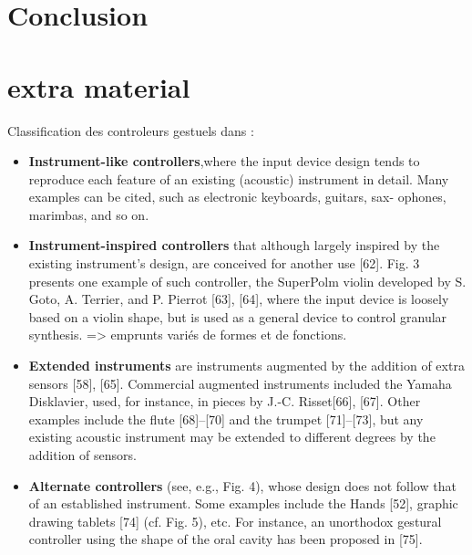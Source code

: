 \section{Conclusion}
\label{sec:interfaces:conclusion}


\section*{extra material}

Classification des controleurs gestuels dans \cite{wanderley_controle_1999}:
\vspace{-1em}
\begin{itemize}[noitemsep]
\item \textbf{Instrument-like controllers},where the input device design tends to reproduce each feature of an existing (acoustic) instrument in detail. Many examples can be cited, such as electronic keyboards, guitars, sax- ophones, marimbas, and so on.
\item \textbf{Instrument-inspired controllers} that although largely inspired by the existing instrument’s design, are conceived for another use [62]. Fig. 3 presents one example of such controller, the SuperPolm violin developed by S. Goto, A. Terrier, and P. Pierrot [63], [64], where the input device is loosely based on a violin shape, but is used as a general device to control granular synthesis. => emprunts variés de formes et de fonctions.
\item \textbf{Extended instruments} are instruments augmented by the addition of extra sensors [58], [65]. Commercial augmented instruments included the Yamaha Disklavier, used, for instance, in pieces by J.-C. Risset[66], [67]. Other examples include the flute [68]–[70] and the trumpet [71]–[73], but any existing acoustic instrument may be extended to different degrees by the addition of sensors.
\item \textbf{Alternate controllers} (see, e.g., Fig. 4), whose design does not follow that of an established instrument. Some examples include the Hands [52], graphic drawing tablets [74] (cf. Fig. 5), etc. For instance, an unorthodox gestural controller using the shape of the oral cavity has been proposed in [75].
\end{itemize}

